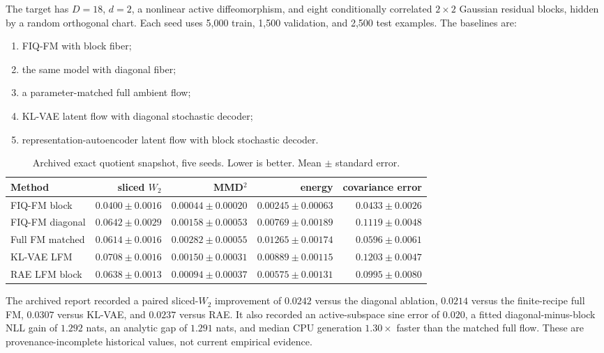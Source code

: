 The target has $D=18$, $d=2$, a nonlinear active diffeomorphism, and eight conditionally correlated $2\times2$ Gaussian residual blocks, hidden by a random orthogonal chart.  Each seed uses 5,000 train, 1,500 validation, and 2,500 test examples.  The baselines are:
\begin{enumerate}[leftmargin=*]
\item FIQ-FM with block fiber;
\item the same model with diagonal fiber;
\item a parameter-matched full ambient flow;
\item KL-VAE latent flow with diagonal stochastic decoder;
\item representation-autoencoder latent flow with block stochastic decoder.
\end{enumerate}

\begin{table}[h]
\centering
\small
\setlength{\tabcolsep}{4pt}
\caption{Archived exact quotient snapshot, five seeds. Lower is better. Mean $\pm$ standard error.}
\begin{tabular}{lrrrr}
\toprule
Method & sliced $W_2$ & MMD$^2$ & energy & covariance error\\
\midrule
FIQ-FM block & $\mathbf{0.0400\pm0.0016}$ & $\mathbf{0.00044\pm0.00020}$ & $\mathbf{0.00245\pm0.00063}$ & $\mathbf{0.0433\pm0.0026}$\\
FIQ-FM diagonal & $0.0642\pm0.0029$ & $0.00158\pm0.00053$ & $0.00769\pm0.00189$ & $0.1119\pm0.0048$\\
Full FM matched & $0.0614\pm0.0016$ & $0.00282\pm0.00055$ & $0.01265\pm0.00174$ & $0.0596\pm0.0061$\\
KL-VAE LFM & $0.0708\pm0.0016$ & $0.00150\pm0.00031$ & $0.00889\pm0.00115$ & $0.1203\pm0.0047$\\
RAE LFM block & $0.0638\pm0.0013$ & $0.00094\pm0.00037$ & $0.00575\pm0.00131$ & $0.0995\pm0.0080$\\
\bottomrule
\end{tabular}
\label{tab:synth}
\end{table}

The archived report recorded a paired sliced-$W_2$ improvement of $0.0242$ versus the diagonal ablation, $0.0214$ versus the finite-recipe full FM, $0.0307$ versus KL-VAE, and $0.0237$ versus RAE.  It also recorded an active-subspace sine error of $0.020$, a fitted diagonal-minus-block NLL gain of $1.292$ nats, an analytic gap of $1.291$ nats, and median CPU generation $1.30\times$ faster than the matched full flow.  These are provenance-incomplete historical values, not current empirical evidence.

